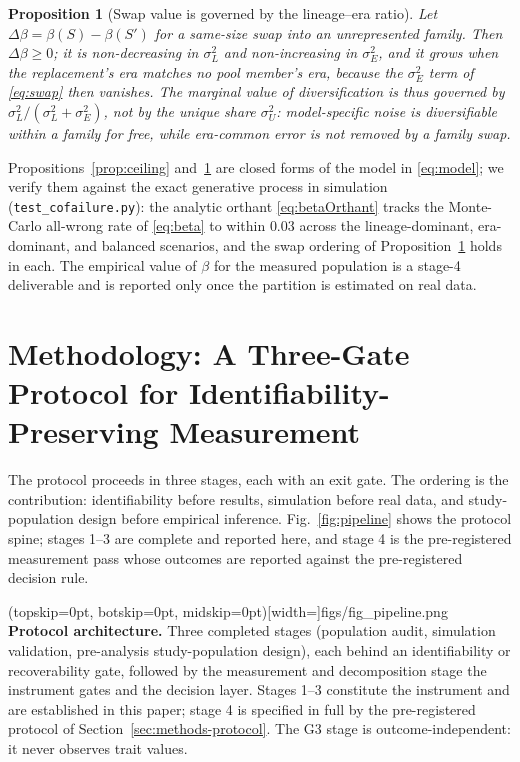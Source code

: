 \documentclass{ieeeaccess}
\theoremstyle{definition}
\theoremstyle{plain}
\newtheorem{proposition}{Proposition}
\begin{document}
\begin{proposition}[Swap value is governed by the lineage--era ratio]
\label{prop:swap}
Let $\Delta\beta=\beta(S)-\beta(S')$ for a same-size swap into an unrepresented
family. Then $\Delta\beta\ge0$; it is non-decreasing in $\sigma^{2}_{L}$ and
non-increasing in $\sigma^{2}_{E}$, and it grows when the replacement's era
matches no pool member's era, because the $\sigma^{2}_{E}$ term of
\eqref{eq:swap} then vanishes. The marginal value of diversification is thus
governed by $\sigma^{2}_{L}/(\sigma^{2}_{L}+\sigma^{2}_{E})$, not by the unique
share $\sigma^{2}_{U}$: model-specific noise is diversifiable within a family
for free, while era-common error is not removed by a family swap.
\end{proposition}

Propositions~\ref{prop:ceiling} and~\ref{prop:swap} are closed forms of the
model in \eqref{eq:model}; we verify them against the exact generative process
in simulation (\texttt{test\_cofailure.py}): the analytic orthant
\eqref{eq:betaOrthant} tracks the Monte-Carlo all-wrong rate of \eqref{eq:beta}
to within $0.03$ across the lineage-dominant, era-dominant, and balanced
scenarios, and the swap ordering of Proposition~\ref{prop:swap} holds in each.
The empirical value of $\beta$ for the measured population is a stage-4
deliverable and is reported only once the partition is estimated on real data.

\section{Methodology: A Three-Gate Protocol for Identifiability-Preserving Measurement}
\label{sec:methods}
The protocol proceeds in three stages, each with an exit gate. The ordering is the
contribution: identifiability before results, simulation before real data, and
study-population design before empirical inference. Fig.~\ref{fig:pipeline}
shows the protocol spine; stages 1--3 are complete and reported here, and stage 4
is the pre-registered measurement pass whose outcomes are reported against the
pre-registered decision rule.

\Figure[t!](topskip=0pt, botskip=0pt, midskip=0pt)[width=\textwidth]{figs/fig_pipeline.png}
{ \textbf{Protocol architecture.} Three completed stages (population audit,
simulation validation, pre-analysis study-population design), each behind an
identifiability or recoverability gate, followed by the measurement and
decomposition stage the instrument gates and the decision layer. Stages 1--3
constitute the instrument and are established in this paper; stage 4 is
specified in full by the pre-registered protocol of
Section~\ref{sec:methods-protocol}. The G3 stage is outcome-independent: it
never observes trait values.\label{fig:pipeline}}
\end{document}
